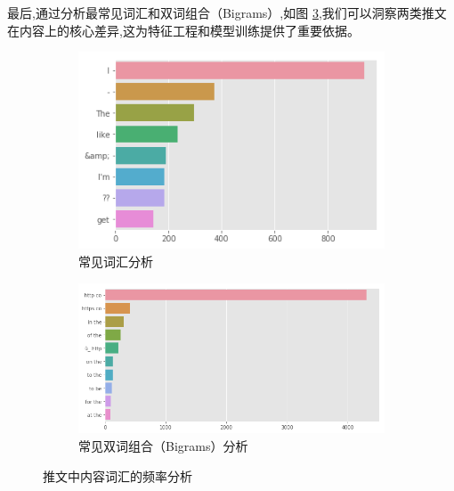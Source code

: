 最后,通过分析最常见词汇和双词组合（Bigrams）,如图 \ref{fig:lstm_eda_content},我们可以洞察两类推文在内容上的核心差异,这为特征工程和模型训练提供了重要依据。
\begin{figure}[H]
    \centering
    \begin{subfigure}[b]{0.48\textwidth}
        \centering
        \includegraphics[width=\textwidth]{figures/LSTM9.png}
        \caption{常见词汇分析}
        \label{fig:common_words}
    \end{subfigure}
    \hfill
    \begin{subfigure}[b]{0.48\textwidth}
        \centering
        \includegraphics[width=\textwidth]{figures/LSTM10.png}
        \caption{常见双词组合（Bigrams）分析}
        \label{fig:common_bigrams}
    \end{subfigure}
    \caption{推文中内容词汇的频率分析}
    \label{fig:lstm_eda_content}
\end{figure}



